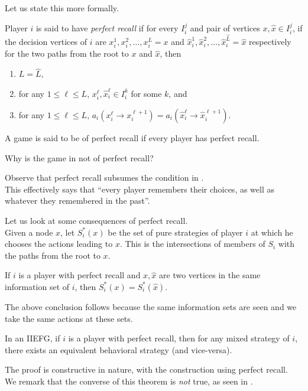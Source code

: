 		Let us state this more formally.

		\begin{fdef}
			Player $i$ is said to have \emph{perfect recall} if for every $I_i^j$ and pair of vertices $x,\hat{x} \in I_i^j$, if the decision vertices of $i$ are $x_i^1,x_i^2,\ldots,x_i^L = x$ and $\hat{x}_i^1,\hat{x}_i^2,\ldots,\hat{x}_i^{\hat{L}} = \hat{x}$ respectively for the two paths from the root to $x$ and $\hat{x}$, then
			\begin{enumerate}
				\item $L = \hat{L}$,
				\item for any $1 \le \ell \le L$, $x_i^\ell,\hat{x}_i^\ell \in I_i^k$ for some $k$, and
				\item for any $1 \le \ell \le L$, $a_i(x_i^\ell \to x_i^{\ell+1}) = a_i(\hat{x}_i^\ell \to \hat{x}_i^{\ell+1})$.
			\end{enumerate}
			A game is said to be of perfect recall if every player has perfect recall.
		\end{fdef}
		Why is the game in  not of perfect recall?

		Observe that perfect recall subsumes the condition in .\\
		This effectively says that ``every player remembers their choices, as well as whatever they remembered in the past''.

		Let us look at some consequences of perfect recall.\\
		Given a node $x$, let $S_i^*(x)$ be the set of pure strategies of player $i$ at which he chooses the actions leading to $x$. This is the intersections of members of $S_i$ with the paths from the root to $x$.
		\begin{ftheo}
			If $i$ is a player with perfect recall and $x,\hat{x}$ are two vertices in the same information set of $i$, then $S_i^*(x) = S_i^*(\hat{x})$.
		\end{ftheo}

		The above conclusion follows because the same information sets are seen and we take the same actions at these sets.

		\begin{ftheo}[Kuhn]
			In an IIEFG, if $i$ is a player with perfect recall, then for any mixed strategy of $i$, there exists an equivalent behavioral strategy (and vice-versa).
		\end{ftheo}
		The proof is constructive in nature, with the construction using perfect recall.\\
		We remark that the converse of this theorem is \emph{not} true, as seen in .

